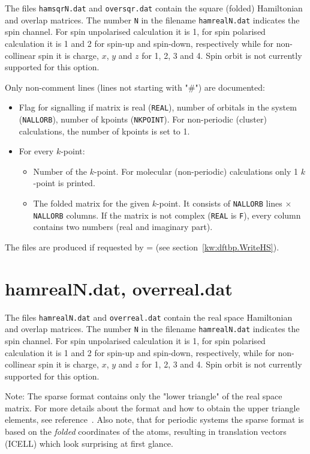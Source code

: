 The files \verb|hamsqrN.dat| and \verb|oversqr.dat| contain the square
(folded) Hamiltonian and overlap matrices. The number \verb|N| in the
filename \verb|hamrealN.dat| indicates the spin channel. For spin
unpolarised calculation it is 1, for spin polarised calculation it is
1 and 2 for spin-up and spin-down, respectively while for non-collinear
spin it is charge, $x$, $y$ and $z$ for 1, 2, 3 and 4. Spin orbit is
not currently supported for this option.

Only non-comment lines (lines not starting with "\#") are documented:
\begin{itemize}

\item Flag for signalling if matrix is real (\verb|REAL|), number of
  orbitals in the system (\verb|NALLORB|), number of kpoints
  (\verb|NKPOINT|). For non-periodic (cluster) calculations, the
  number of kpoints is set to 1.

\item For every $k$-point:
  \begin{itemize}
  \item Number of the $k$-point. For molecular (non-periodic)
    calculations only 1 $k$-point is printed.
  \item The folded matrix for the given $k$-point. It consists of
    \verb|NALLORB| lines $\times$ \verb|NALLORB| columns. If the
    matrix is not complex (\verb|REAL| is \verb|F|), every column
    contains two numbers (real and imaginary part).
  \end{itemize}
\end{itemize}

The files are produced if requested by  =  (see
section~\ref{kw:dftbp.WriteHS}).

\section{hamrealN.dat, overreal.dat}
\label{sec:hamreal}
 The files \verb|hamrealN.dat|
and \verb|overreal.dat| contain the real space Hamiltonian and overlap
matrices. The number \verb|N| in the filename \verb|hamrealN.dat|
indicates the spin channel. For spin unpolarised calculation it is 1,
for spin polarised calculation it is 1 and 2 for spin-up and
spin-down, respectively, while for non-collinear spin it is charge,
$x$, $y$ and $z$ for 1, 2, 3 and 4. Spin orbit is not currently
supported for this option.

Note: The sparse format contains only the "lower triangle" of the real
space matrix. For more details about the format and how to obtain the
upper triangle elements, see reference~\cite{dftbp-paper}. Also note,
that for periodic systems the sparse format is based on the
\emph{folded} coordinates of the atoms, resulting in translation
vectors (ICELL) which look surprising at first glance.

